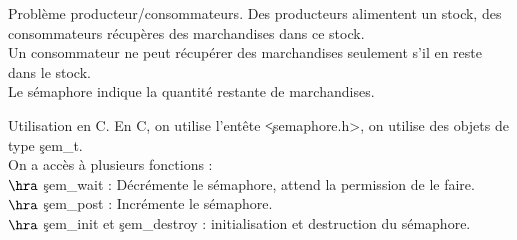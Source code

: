\documentclass[french, 11pt]{article}
\begin{document}
\begin{defi}{Problème producteur/consommateurs.}{}
    Des producteurs alimentent un stock, des consommateurs récupères des marchandises dans ce stock.\\
    Un consommateur ne peut récupérer des marchandises seulement s'il en reste dans le stock.\\
    Le sémaphore indique la quantité restante de marchandises.
\end{defi}

\begin{defi}{Utilisation en C.}{}
    En C, on utilise l'entête \c{<semaphore.h>}, on utilise des objets de type \c{sem_t}.\\
    On a accès à plusieurs fonctions :\\
    $\hra$ \c{sem_wait} : Décrémente le sémaphore, attend la permission de le faire.\\
    $\hra$ \c{sem_post} : Incrémente le sémaphore.\\
    $\hra$ \c{sem_init} et \c{sem_destroy} : initialisation et destruction du sémaphore.
\end{defi}
\end{document}
